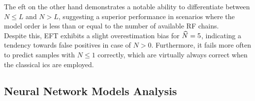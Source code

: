 The \gls{eft} on the other hand demonstrates a notable ability to differentiate between \( N \leq L \) and \( N > L \), suggesting a
superior performance in scenarios where the model order is less than or equal to the number of available RF chains. \\
Despite this, EFT exhibits a slight overestimation bias for \( \widehat{N} = 5 \), indicating a tendency towards false
positives in case of \( N > 0 \). Furthermore, it fails more often to predict samples with \( N \leq 1 \) correctly, which
are virtually always correct when the classical \glspl{ic} are employed. \\

\subsection{Neural Network Models Analysis}
\label{sub:nn_conf_matrices}

